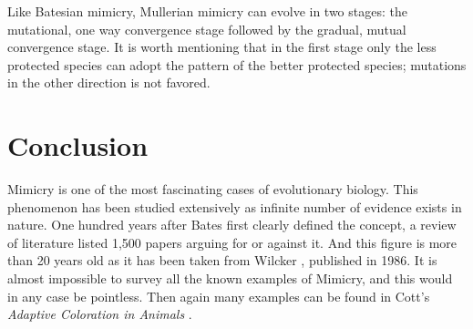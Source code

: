 Like Batesian mimicry, Mullerian mimicry can evolve in two stages: the mutational, one way convergence stage followed by the gradual, mutual convergence stage. It is worth mentioning that in the first stage only the less protected species can adopt the pattern of the better protected species; mutations in the other direction is not favored.

\section{Conclusion}
Mimicry is one of the most fascinating cases of evolutionary biology. This phenomenon has been studied extensively as infinite number of evidence exists in nature. One hundred years after Bates first clearly defined the concept, a review of literature listed 1,500 papers arguing for or against it. And this figure is more than 20 years old as it has been taken from Wilcker \cite{wickler1986}, published in 1986. It is almost impossible to survey all the known examples of Mimicry, and this would in any case be pointless. Then again many examples can be found in Cott's \textit{Adaptive Coloration in Animals} \cite{cott1957}.


